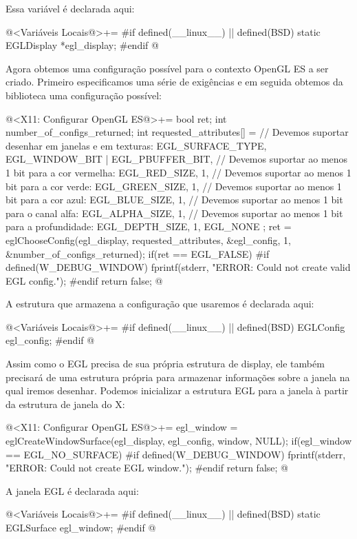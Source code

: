Essa variável é declarada aqui:

\iniciocodigo
@<Variáveis Locais@>+=
#if defined(__linux__) || defined(BSD)
static EGLDisplay *egl_display;
#endif
@
\fimcodigo

Agora obtemos uma configuração possível para o contexto OpenGL ES a
ser criado. Primeiro especificamos uma série de exigências e em
seguida obtemos da biblioteca uma configuração possível:

\iniciocodigo
@<X11: Configurar OpenGL ES@>+=
{
  bool ret;
  int number_of_configs_returned;
  int requested_attributes[] = {
    // Devemos suportar desenhar em janelas e em texturas:
    EGL_SURFACE_TYPE,  EGL_WINDOW_BIT | EGL_PBUFFER_BIT,
    // Devemos suportar ao menos 1 bit para a cor vermelha:
    EGL_RED_SIZE, 1,
    // Devemos suportar ao menos 1 bit para a cor verde:
    EGL_GREEN_SIZE, 1,
    // Devemos suportar ao menos 1 bit para a cor azul:
    EGL_BLUE_SIZE, 1,
    // Devemos suportar ao menos 1 bit para o canal alfa:
    EGL_ALPHA_SIZE, 1,
    // Devemos suportar ao menos 1 bit para a profundidade:
    EGL_DEPTH_SIZE, 1,
    EGL_NONE
  };
  ret = eglChooseConfig(egl_display, requested_attributes,
                        &egl_config, 1, &number_of_configs_returned);
  if(ret == EGL_FALSE){
#if defined(W_DEBUG_WINDOW)
    fprintf(stderr, "ERROR: Could not create valid EGL config.\n");
#endif
    return false;
  }
}
@
\fimcodigo

A estrutura que armazena a configuração que usaremos é declarada aqui:

\iniciocodigo
@<Variáveis Locais@>+=
#if defined(__linux__) || defined(BSD)
EGLConfig egl_config;
#endif
@
\fimcodigo


Assim como o EGL precisa de sua própria estrutura de display, ele
também precisará de uma estrutura própria para armazenar informações
sobre a janela na qual iremos desenhar. Podemos inicializar a
estrutura EGL para a janela à partir da estrutura de janela do X:

\iniciocodigo
@<X11: Configurar OpenGL ES@>+=
egl_window = eglCreateWindowSurface(egl_display, egl_config, window,
                                    NULL);
if(egl_window == EGL_NO_SURFACE){
#if defined(W_DEBUG_WINDOW)
  fprintf(stderr, "ERROR: Could not create EGL window.\n");
#endif
  return false;
}
@
\fimcodigo

A janela EGL é declarada aqui:

\iniciocodigo
@<Variáveis Locais@>+=
#if defined(__linux__) || defined(BSD)
static EGLSurface egl_window;
#endif
@
\fimcodigo


